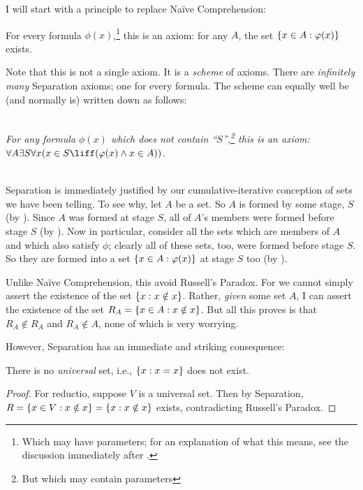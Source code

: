 \documentclass[../../../include/open-logic-section]{subfiles}
\begin{document}

I will start with a principle to replace Na\"{i}ve Comprehension:

\begin{axiom} For every formula
$\phi(x)$,\footnote{Which may have parameters; for an explanation of
what this means, see the discussion immediately after
.} this is an
axiom: for any $A$, the set $\{ x \in A : \varphi(x) \}$ exists.
\end{axiom}

Note that this is not a single axiom. It is a \emph{scheme} of axioms.
There are \emph{infinitely many} Separation axioms; one for every
formula. The scheme can equally well be (and normally is) written down
as follows:

\ \\\emph{For any formula $\phi(x)$ which does not contain
``$S$'',\footnote{But which may contain parameters} this is an axiom:
\\$\forall A \exists S \forall x(x \in S \liff (\phi(x) \land x \in
A))$.}

\ \\Separation is immediately justified by our cumulative-iterative
conception of sets we have been telling. To see why, let $A$ be a set.
So $A$ is formed by some stage, $S$ (by \stageshier). Since $A$ was
formed at stage $S$, all of $A$'s members were formed before stage $S$
(by \stagesacc). Now in particular, consider all the sets which are
members of $A$ and which also satisfy $\phi$; clearly all of these
sets, too, were formed before stage $S$. So they are formed into a set
$\{ x \in A : \varphi(x) \}$ at stage $S$ too (by \stagesacc). 

Unlike Na\"ive Comprehension, this avoid Russell's Paradox. For we
cannot simply assert the existence of the set $\{ x : x \notin
x \}$. Rather, \emph{given} some set $A$, I can assert the existence of
the set $R_A = \{ x \in A : x \notin x \}$. But all this proves is
that $R_A \notin R_A$ and $R_A \notin A$, none of which is very
worrying. 

However, Separation has an immediate and striking consequence:

\begin{thm}
There is no \emph{universal} set, i.e., $\{ x : x = x \}$ does not exist.
\end{thm}

\begin{proof}
For reductio, suppose $V$ is a universal set. Then by Separation, $R =
\{ x \in V : x \notin x \} = \{ x : x \notin x \}$ exists,
contradicting Russell's Paradox.
\end{proof}
\end{document}
